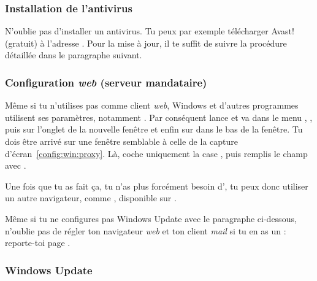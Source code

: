 


\subsubsection{Installation de l'antivirus}
\label{antivirus} 

N'oublie pas d'installer un antivirus. Tu peux par exemple télécharger Avast! (gratuit) à l'adresse . Pour la mise à jour, il te suffit de suivre la procédure détaillée dans le paragraphe suivant.

\subsubsection{Configuration \emph{web} (serveur mandataire)}


M\^eme si tu n'utilises pas  comme client \emph{web}, Windows et d'autres programmes
utilisent ses param\`etres, notamment . Par conséquent lance  et va
dans le menu , , puis sur l'onglet  de la
nouvelle fen\^etre et enfin sur  dans le bas de la fen\^etre. Tu dois \^etre arriv\'e sur une fen\^etre semblable \`a celle de la capture d'\'ecran~\ref{config:win:proxy}. L\`a, coche
uniquement la case , puis remplis le champ
 avec .

Une fois que tu as fait \c{c}a, tu n'as plus forc\'ement besoin d', tu peux donc utiliser un autre navigateur, comme , disponible sur .

Même si tu ne configures pas Windows Update avec le paragraphe ci-dessous, n'oublie pas de régler ton navigateur \emph{web} et ton client \emph{mail} si tu en as un : reporte-toi page \pageref{browser}.

\subsubsection{Windows Update}

